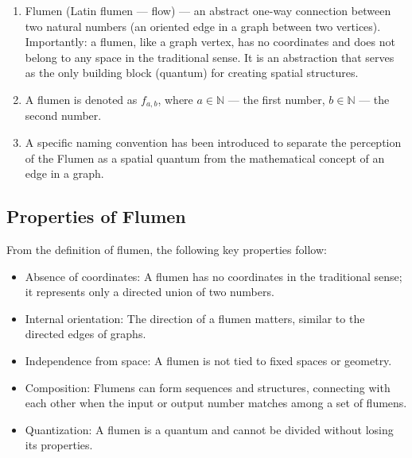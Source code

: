 \documentclass[final]{article}
\begin{document}
        \begin{enumerate}

            \item Flumen (Latin flumen — flow) — an abstract one-way connection 
            between two natural numbers (an oriented edge in a graph between two 
            vertices). Importantly: a flumen, like a graph vertex, has no 
            coordinates and does not belong to any space in the traditional 
            sense. It is an abstraction that serves as the only building block 
            (quantum) for creating spatial structures.

            \item A flumen is denoted as \( f_{a,b} \), where \( a \in 
            \mathbb{N} \) — the first number, \( b \in \mathbb{N} \) — the 
            second number.

            \item A specific naming convention has been introduced to separate 
            the perception of the Flumen as a spatial quantum from the 
            mathematical concept of an edge in a graph.

        \end{enumerate}


    \subsection{Properties of Flumen}

        From the definition of flumen, the following key properties follow:
        \begin{itemize}
            \item Absence of coordinates: A flumen has no coordinates in the traditional
            sense; it represents only a directed union of two
            numbers.
            \item Internal orientation: The direction of a flumen matters, similar to the directed edges of graphs.
            \item Independence from space: A flumen is not tied to fixed
            spaces or geometry.
            \item Composition: Flumens can form sequences and
            structures, connecting with each other when the input
            or output number matches among a set of flumens.
            \item Quantization: A flumen is a quantum and cannot be divided
            without losing its properties.
        \end{itemize}
\end{document}
